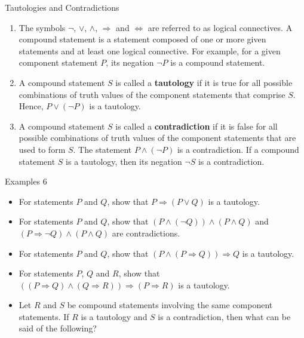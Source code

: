 \documentclass{beamer}
\begin{document}
\begin{frame}{Tautologies and Contradictions}
    \begin{enumerate}
        \item The symbols $\neg$, $\lor$, $\land$, $\Rightarrow$ and $\Leftrightarrow$ are referred to as logical connectives. A compound statement is a statement composed of one or more given statements and at least one logical connective. For example, for a given component statement $P$, its negation $\neg P$ is a compound statement.
        \item A compound statement $S$ is called a \textbf{tautology} if it is true for all possible combinations of truth values of the component statements that comprise $S$. Hence, $P \lor (\neg P)$ is a tautology.
        \item A compound statement $S$ is called a \textbf{contradiction} if it is false for all possible combinations of truth values of the component statements that are used to form $S$. The statement $P \land (\neg P)$ is a contradiction. If a compound statement $S$ is a tautology, then its negation $\neg S$ is a contradiction.
    \end{enumerate}
\end{frame}

\begin{frame}{Examples 6}
\begin{itemize}
    \item For statements $P$ and $Q$, show that $P \Rightarrow (P \lor Q)$ is a tautology.
    \item For statements $P$ and $Q$, show that $(P \land (\neg Q)) \land (P \land Q)$ and $(P \Rightarrow \neg Q) \land (P \land Q)$ are contradictions.
    \item For statements $P$ and $Q$, show that $(P \land (P \Rightarrow Q)) \Rightarrow Q$ is a tautology. 
    \item For statements $P$, $Q$ and $R$, show that $((P \Rightarrow Q) \land (Q \Rightarrow R)) \Rightarrow (P \Rightarrow R)$ is a tautology.
    \item Let $R$ and $S$ be compound statements involving the same component statements. If $R$ is a tautology and $S$ is a contradiction, then what can be said of the following?
\end{itemize}
\end{frame}
\end{document}

